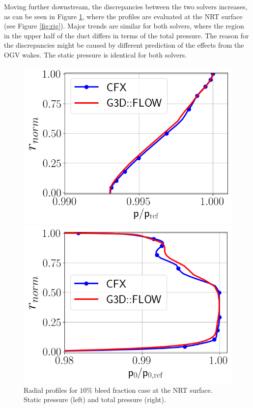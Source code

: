 Moving further downstream, the discrepancies between the two solvers increases, as can be seen in Figure \ref{fig:NRT10}, where the profiles are evaluated at the NRT surface (see Figure \ref{fig:rig}). Major trends are similar for both solvers, where the region in the upper half of the duct differs in terms of the total pressure. The reason for the discrepancies might be caused by different prediction of the effects from the OGV wakes. The static pressure is identical for both solvers.

\begin{figure}[h!]
  \centering
  \begin{minipage}{0.48\columnwidth}
  \includegraphics[width=1.\textwidth]{figures/PAaveB10_NRT.png}
  \end{minipage}
  \begin{minipage}{0.48\columnwidth}
  \includegraphics[width=1.\textwidth]{figures/P0MaveB10_NRT.png}
  \end{minipage}
  \caption{Radial profiles for $10\%$ bleed fraction case at the NRT surface. Static pressure (left) and total pressure (right).} \label{fig:NRT10}
\end{figure}

